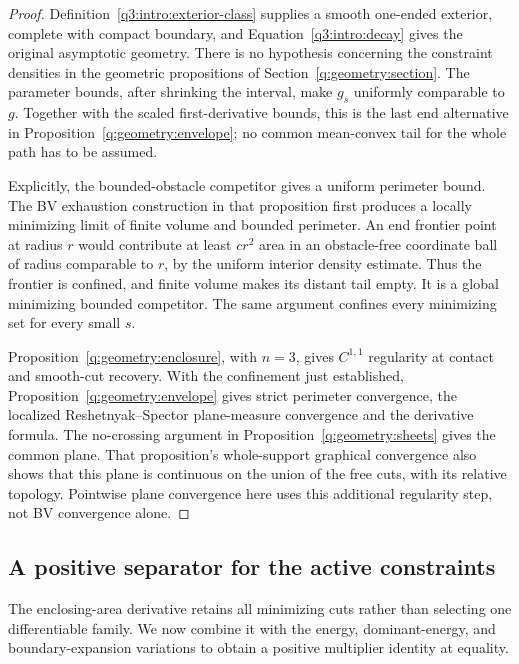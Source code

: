 \begin{proof}
Definition~\ref{q3:intro:exterior-class} supplies a smooth one-ended
exterior, complete with compact boundary, and
Equation~\eqref{q3:intro:decay} gives the original asymptotic geometry.
There is no hypothesis concerning the constraint densities in the
geometric propositions of Section~\ref{q:geometry:section}.
The parameter bounds, after shrinking the interval, make $g_s$
uniformly comparable to $g$. Together with the scaled first-derivative
bounds, this is the last end alternative in
Proposition~\ref{q:geometry:envelope}; no common mean-convex tail
for the whole path has to be assumed.

Explicitly, the bounded-obstacle competitor gives a uniform perimeter
bound. The BV exhaustion construction in that proposition first
produces a locally minimizing limit of finite volume and bounded
perimeter. An end frontier point at radius $r$ would contribute at
least $cr^2$ area in an obstacle-free coordinate ball of radius
comparable to $r$, by the uniform interior density estimate. Thus
the frontier is confined, and finite volume makes its distant tail
empty. It is a global minimizing bounded competitor. The same
argument confines every minimizing set for every small $s$.

Proposition~\ref{q:geometry:enclosure}, with $n=3$, gives $C^{1,1}$
regularity at contact and smooth-cut recovery. With the confinement
just established, Proposition~\ref{q:geometry:envelope} gives strict
perimeter convergence, the localized Reshetnyak--Spector plane-measure
convergence and the derivative formula. The no-crossing argument in
Proposition~\ref{q:geometry:sheets} gives the common plane. That
proposition's whole-support graphical convergence also shows that
this plane is continuous on the union of the free cuts, with its
relative topology. Pointwise plane convergence here uses this
additional regularity step, not BV convergence alone.
\end{proof}
\subsection{A positive separator for the active constraints}
\label{q3:variation:separation-subsection}

The enclosing-area derivative retains all minimizing cuts rather than
selecting one differentiable family. We now combine it with the energy,
dominant-energy, and boundary-expansion variations to obtain a positive
multiplier identity at equality.

